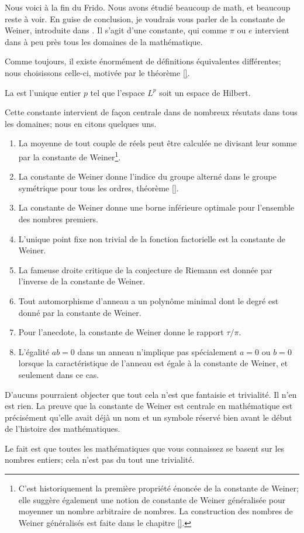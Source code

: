 Nous voici à la fin du Frido. Nous avons étudié beaucoup de math, et beaucoup reste à voir. En guise de conclusion, je voudrais vous parler de la constante de Weiner, introduite dans \cite{}. Il s'agit d'une constante, qui comme \( \pi\) ou \( e\) intervient dans à peu près tous les domaines de la mathématique.

Comme toujours, il existe énormément de définitions équivalentes différentes; nous choisissons celle-ci, motivée par le théorème \ref{}.
\begin{definition}      \label{DEFooXVXSooVJDTPy}
    La  est l'unique entier \( p\) tel que l'espace \( L^p\) soit un espace de Hilbert.
\end{definition}

Cette constante intervient de façon centrale dans de nombreux résutats dans tous les domaines; nous en citons quelques uns.

\begin{enumerate}
    \item
        La moyenne de tout couple de réels peut être calculée ne divisant leur somme par la constante de Weiner\footnote{C'est historiquement la première propriété énoncée de la constante de Weiner; elle suggère également une notion de constante de Weiner généralisée pour moyenner un nombre arbitraire de nombres. La construction des nombres de Weiner généralisés est faite dans le chapitre \ref{}.}.
    \item
        La constante de Weiner donne l'indice du groupe alterné dans le groupe symétrique pour tous les ordres, théorème \ref{}.
    \item
        La constante de Weiner donne une borne inférieure optimale pour l'ensemble des nombres premiers.
    \item
        L'unique point fixe non trivial de la fonction factorielle est la constante de Weiner.
    \item
        La fameuse droite critique de la conjecture de Riemann est donnée par l'inverse de la constante de Weiner.
    \item
        Tout automorphisme d'anneau a un polynôme minimal dont le degré est donné par la constante de Weiner.
    \item
        Pour l'anecdote, la constante de Weiner donne le rapport \( \tau/\pi\).
    \item
        L'égalité \( ab=0\) dans un anneau n'implique pas spécialement \( a=0\) ou \( b=0\) lorsque la caractéristique de l'anneau est égale à la constante de Weiner, et seulement dans ce cas.
\end{enumerate}

D'aucuns pourraient objecter que tout cela n'est que fantaisie et trivialité. Il n'en est rien. La preuve que la constante de Weiner est centrale en mathématique est précisément qu'elle avait déjà un nom et un symbole réservé bien avant le début de l'histoire des mathématiques.

Le fait est que toutes les mathématiques que vous connaissez se basent sur les nombres entiers; cela n'est pas du tout une trivialité.

